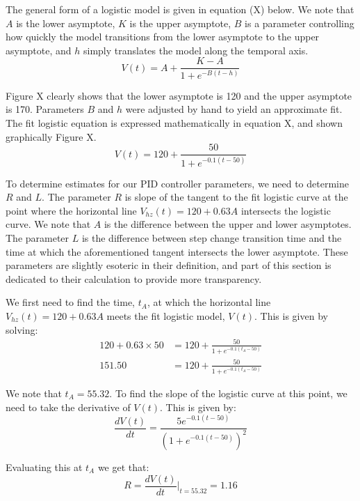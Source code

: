 \documentclass{article}
\begin{document}
\vspace{0.5cm}

The general form of a logistic model is given in equation (X) below. We note that $A$ is the lower asymptote, $K$ is the upper asymptote, $B$ is a parameter controlling how quickly the model transitions from the lower asymptote to the upper asymptote, and $h$ simply translates the model along the temporal axis.
\begin{equation}
	V(t) = A + \frac{K - A}{1 + e^{-B(t - h)}}
\end{equation}

Figure X clearly shows that the lower asymptote is 120 and the upper asymptote is 170. Parameters $B$ and $h$ were adjusted by hand to yield an approximate fit. The fit logistic equation is expressed mathematically in equation X, and shown graphically Figure X.
\begin{equation}
V(t) = 120 + \frac{50}{1 + e^{-0.1(t - 50)}} 
\end{equation}

To determine estimates for our PID controller parameters, we need to determine $R$ and $L$. The parameter $R$ is slope of the tangent to the fit logistic curve at the point where the horizontal line $V_{hz}(t) = 120 + 0.63A$ intersects the logistic curve. We note that $A$ is the difference between the upper and lower asymptotes. The parameter $L$ is the difference between step change transition time and the time at which the aforementioned tangent intersects the lower asymptote. These parameters are slightly esoteric in their definition, and part of this section is dedicated to their calculation to provide more transparency.

We first need to find the time, $t_A$, at which the horizontal line $V_{hz}(t) = 120 + 0.63A$ meets the fit logistic model, $V(t)$. This is given by solving:
\begin{align}
120 + 0.63 \times 50 &= 120 + \frac{50}{1 + e^{-0.1(t_A - 50)}}\\
151.50 &= 120 + \frac{50}{1 + e^{-0.1(t_A - 50)}}
\end{align} 

We note that $t_A = 55.32$. To find the slope of the logistic curve at this point, we need to take the derivative of $V(t)$. This is given by:
\begin{equation}
	\frac{dV(t)}{dt} = \frac{5 e^{-0.1(t-50)}}{(1 + e^{-0.1(t-50)})^2}
\end{equation}

Evaluating this at $t_A$ we get that:
\begin{equation}
	R = \frac{dV(t)}{dt}\Bigr|_{t=55.32} = 1.16
\end{equation}
\end{document}
